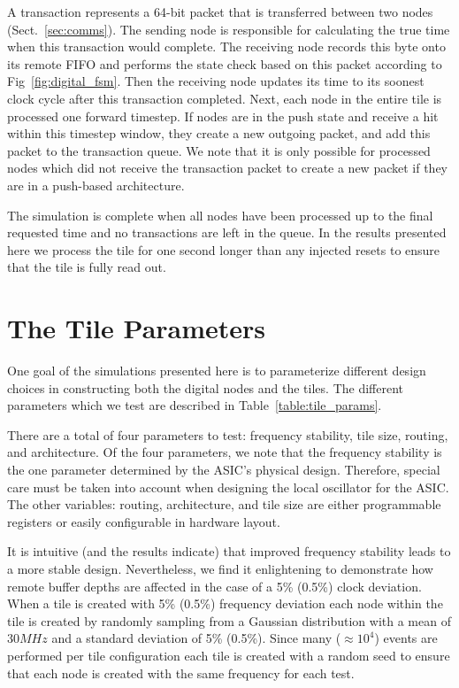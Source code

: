 A transaction represents a 64-bit packet that is transferred between two nodes (Sect.~\ref{sec:comms}).
The sending node is responsible for calculating the true time when this transaction would complete.
The receiving node records this byte onto its remote FIFO and performs the state check based on this packet according to Fig~\ref{fig:digital_fsm}.
Then the receiving node updates its time to its soonest clock cycle after this transaction completed.
Next, each node in the entire tile is processed one forward timestep.
If nodes are in the push state and receive a hit within this timestep window, they create a new outgoing packet, and add this packet to the transaction queue.
We note that it is only possible for processed nodes which did not receive the transaction packet to create a new packet if they are in a push-based architecture. 

The simulation is complete when all nodes have been processed up to the final requested time and no transactions are left in the queue. 
In the results presented here we process the tile for one second longer than any injected resets to ensure that the tile is fully read out.


\section{The Tile Parameters}

One goal of the simulations presented here is to parameterize different design choices in constructing both the digital nodes and the tiles.
The different parameters which we test are described in Table~\ref{table:tile_params}.

There are a total of four parameters to test: frequency stability, tile size, routing, and architecture.
Of the four parameters, we note that the frequency stability is the one parameter determined by the ASIC's physical design.
Therefore, special care must be taken into account when designing the local oscillator for the ASIC.
The other variables: routing, architecture, and tile size are either programmable registers or easily configurable in hardware layout.

It is intuitive (and the results indicate) that improved frequency stability leads to a more stable design.
Nevertheless, we find it enlightening to demonstrate how remote buffer depths are affected in the case of a 5\% (0.5\%) clock deviation.
When a tile is created with 5\% (0.5\%) frequency deviation each node within the tile is created by randomly sampling from a Gaussian distribution with a mean of 30$\unit{MHz}$ and a standard deviation of 5\% (0.5\%).
Since many ($\approx 10^4$) events are performed per tile configuration each tile is created with a random seed to ensure that each node is created with the same frequency for each test.

